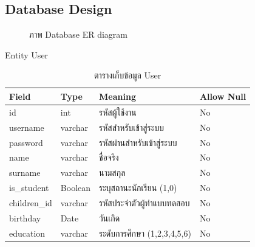 \documentclass[12pt,oneside,openright,a4paper]{cpe-thai-project}
\begin{document}
\begin{landscape}
\section{Database Design}
\begin{figure}[!ht]\centering
    \setlength{\fboxrule}{0.2mm} %
    \setlength{\fboxsep}{1cm}
    \caption{ภาพ Database ER diagram}\label{fig:database}
   \end{figure}
  \end{landscape}

  Entity User
  \begin{table}[!h]\centering
    \caption{ตารางเก็บข้อมูล User}\label{tbl:application1}
    \begin{tabular}{|p{2cm}|p{2cm}|p{7cm}|p{2cm}|} \hline
      Field & Type & Meaning & Allow Null \\ \hline
      id & int & รหัสผู้ใช้งาน & No \\ \hline
      username & varchar & รหัสสำหรับเข้าสู่ระบบ &No \\ \hline
      password & varchar & รหัสผ่านสำหรับเข้าสู่ระบบ & No \\ \hline
      name & varchar & ชื่อจริง & No \\ \hline
      surname & varchar & นามสกุล & No \\ \hline
      is\_student & Boolean & ระบุสถานะนักเรียน (1,0) & No \\ \hline
      children\_id & varchar & รหัสประจำตัวผู้ทำแบบทดสอบ & No \\ \hline
      birthday & Date & วันเกิด & No \\ \hline
      education & varchar & ระดับการศึกษา (1,2,3,4,5,6) & No \\ \hline
    \end{tabular}
    \end{table}
\end{document}
